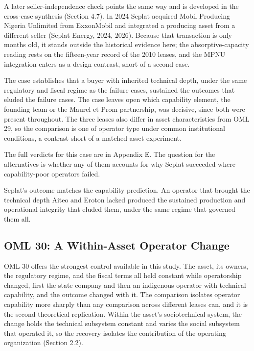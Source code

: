 \documentclass[twoside,fontset=lmodern]{mitthesis}
\begin{document}
A later seller-independence check points the same way and is developed
in the cross-case synthesis (Section 4.7). In 2024 Seplat acquired Mobil
Producing Nigeria Unlimited from ExxonMobil and integrated a producing
asset from a different seller (Seplat Energy, 2024, 2026). Because that
transaction is only months old, it stands outside the historical
evidence here; the absorptive-capacity reading rests on the fifteen-year
record of the 2010 leases, and the MPNU integration enters as a design
contrast, short of a second case.

The case establishes that a buyer with inherited technical depth, under
the same regulatory and fiscal regime as the failure cases, sustained
the outcomes that eluded the failure cases. The case leaves open which
capability element, the founding team or the Maurel et Prom partnership,
was decisive, since both were present throughout. The three leases also
differ in asset characteristics from OML 29, so the comparison is one of
operator type under common institutional conditions, a contrast short of
a matched-asset experiment.

The full verdicts for this case are in Appendix E. The question for the
alternatives is whether any of them accounts for why Seplat succeeded
where capability-poor operators failed.

Seplat's outcome matches the capability prediction. An operator that
brought the technical depth Aiteo and Eroton lacked produced the
sustained production and operational integrity that eluded them, under
the same regime that governed them all.

\hypertarget{oml-30-a-within-asset-operator-change}{%
\subsection{OML 30: A Within-Asset Operator
Change}\label{oml-30-a-within-asset-operator-change}}

OML 30 offers the strongest control available in this study. The asset,
its owners, the regulatory regime, and the fiscal terms all held
constant while operatorship changed, first the state company and then an
indigenous operator with technical capability, and the outcome changed
with it. The comparison isolates operator capability more sharply than
any comparison across different leases can, and it is the second
theoretical replication. Within the asset's sociotechnical system, the
change holds the technical subsystem constant and varies the social
subsystem that operated it, so the recovery isolates the contribution of
the operating organization (Section 2.2).
\end{document}
